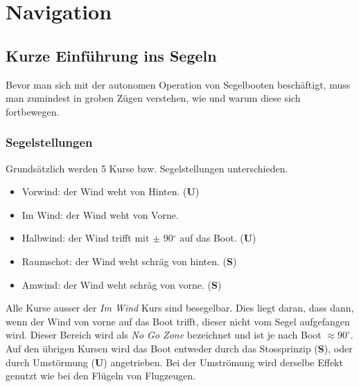 
\chapter{Navigation}
\label{chap:autonomie}
\section{Kurze Einführung ins Segeln}
Bevor man sich mit der autonomen Operation von Segelbooten beschäftigt, muss man zumindest in groben Zügen verstehen, wie und warum diese sich fortbewegen.
\subsection{Segelstellungen}
Grundsätzlich werden 5 Kurse bzw. Segelstellungen unterschieden.
\begin{itemize}
    \item Vorwind: der Wind weht von Hinten. (\textbf{U})
    \item Im Wind: der Wind weht von Vorne.
    \item Halbwind: der Wind trifft mit  $\pm$ 90$^{\circ}$ auf das Boot. (\textbf{U})
    \item Raumschot: der Wind weht schräg von hinten. (\textbf{S})
    \item Amwind: der Wind weht schräg von vorne. (\textbf{S})
\end{itemize}
Alle Kurse ausser der \textit{Im Wind} Kurs sind besegelbar. Dies liegt daran, dass dann, wenn der Wind von vorne auf das Boot trifft, dieser nicht vom Segel aufgefangen wird. Dieser Bereich wird als \textit{No Go Zone} bezeichnet und ist je nach Boot $\approx 90^{\circ}$. Auf den übrigen  Kursen wird das Boot entweder durch das Stossprinzip (\textbf{S}), oder durch Umstörmung (\textbf{U}) angetrieben. Bei der Umströmung wird derselbe Effekt genutzt wie bei den Flügeln von Flugzeugen. 
